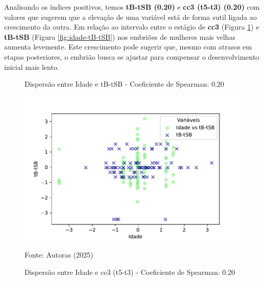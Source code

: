 Analisando os índices positivos, temos \textbf{tB-tSB (0.20)} e \textbf{cc3 (t5-t3) (0.20)} com valores que sugerem que a elevação de uma variável está de forma sutil ligada ao crescimento da outra. Em relação ao intervalo entre o estágio de \textbf{cc3} (Figura \ref{fig:idade-cc3}) e \textbf{tB-tSB} (Figura \ref{fig:idade-tB-tSB}) nos embriões de mulheres mais velhas aumenta levemente. Este crescimento pode sugerir que, mesmo com atrasos em etapas posteriores, o embrião busca se ajustar para compensar o desenvolvimento inicial mais lento.

\begin{figure}[h]
    \captionsetup{font=footnotesize, justification=centering, labelsep=period, position=above}
    \centering
    \begin{minipage}[b]{0.45\linewidth}
        \caption{Dispersão entre Idade e tB-tSB - Coeficiente de Spearman: 0.20}
        \label{fig:idade-tB-tSB}
        \centering
        \includegraphics[scale=0.35]{figuras/Spearman/idade-tB-tSB.pdf}
        \vspace{0.3cm}
        \begin{minipage}{\linewidth}
            \centering
            \scriptsize{Fonte: Autoras (2025)}
        \end{minipage}
    \end{minipage}
    \hspace{0.05\linewidth}
    \begin{minipage}[b]{0.45\linewidth}
        \caption{Dispersão entre Idade e cc3 (t5-t3) - Coeficiente de Spearman: 0.20}
        \label{fig:idade-cc3}
        \centering

\end{minipage}
\end{figure}

